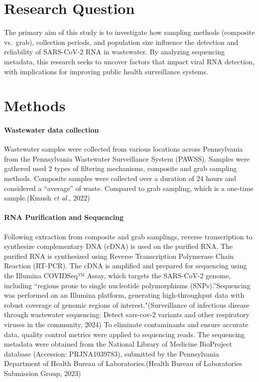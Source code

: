 \documentclass[
]{article}
\begin{document}
\hypertarget{research-question}{%
\section{Research Question}\label{research-question}}

The primary aim of this study is to investigate how sampling methods
(composite vs.~grab), collection periods, and population size influence
the detection and reliability of SARS-CoV-2 RNA in wastewater. By
analyzing sequencing metadata, this research seeks to uncover factors
that impact viral RNA detection, with implications for improving public
health surveillance systems.

\hypertarget{methods}{%
\section{Methods}\label{methods}}

\hypertarget{wastewater-data-collection}{%
\paragraph{Wastewater data
collection}\label{wastewater-data-collection}}

Wastewater samples were collected from various locations across
Pennsylvania from the Pennsylvania Wastewater Surveillance System
(PAWSS). Samples were gathered used 2 types of filtering mechanisms,
composite and grab sampling methods. Composite samples were collected
over a duration of 24 hours and considered a ``average'' of waste.
Compared to grab sampling, which is a one-time sample.(Kmush \emph{et
al.}, 2022)

\hypertarget{rna-purification-and-sequencing}{%
\paragraph{RNA Purification and
Sequencing}\label{rna-purification-and-sequencing}}

Following extraction from composite and grab samplings, reverse
transcription to synthesize complementary DNA (cDNA) is used on the
purified RNA. The purified RNA is synthesized using Reverse
Transcription Polymerase Chain Reaction (RT-PCR). The cDNA is amplified
and prepared for sequencing using the Illumina COVIDSeq™ Assay, which
targets the SARS-CoV-2 genome, including ``regions prone to single
nucleotide polymorphisms (SNPs).''Sequencing was performed on an
Illumina platform, generating high-throughput data with robust coverage
of genomic regions of interest."(Surveillance of infectious disease
through wastewater sequencing: Detect sars-cov-2 variants and other
respiratory viruses in the community, 2024) To eliminate contaminants
and ensure accurate data, quality control metrics were applied to
sequencing reads. The sequencing metadata were obtained from the
National Library of Medicine BioProject database (Accession:
PRJNA1039783), submitted by the Pennsylvania Department of Health Bureau
of Laboratories.(Health Bureau of Laboratories Submission Group, 2023)
\end{document}
